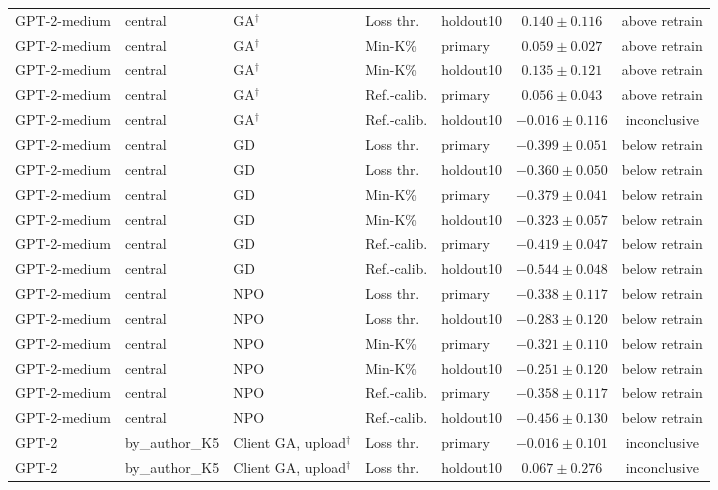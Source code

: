 \begin{table}[t]
\begin{tabular*}{\textwidth}{@{\extracolsep{\fill}}lllllcc@{}}
GPT-2-medium & central & GA$^{\dagger}$ & Loss thr. & holdout10 & $0.140 \pm 0.116$ & above retrain \\
GPT-2-medium & central & GA$^{\dagger}$ & Min-K\% & primary & $0.059 \pm 0.027$ & above retrain \\
GPT-2-medium & central & GA$^{\dagger}$ & Min-K\% & holdout10 & $0.135 \pm 0.121$ & above retrain \\
GPT-2-medium & central & GA$^{\dagger}$ & Ref.-calib. & primary & $0.056 \pm 0.043$ & above retrain \\
GPT-2-medium & central & GA$^{\dagger}$ & Ref.-calib. & holdout10 & $-0.016 \pm 0.116$ & inconclusive \\
GPT-2-medium & central & GD & Loss thr. & primary & $-0.399 \pm 0.051$ & below retrain \\
GPT-2-medium & central & GD & Loss thr. & holdout10 & $-0.360 \pm 0.050$ & below retrain \\
GPT-2-medium & central & GD & Min-K\% & primary & $-0.379 \pm 0.041$ & below retrain \\
GPT-2-medium & central & GD & Min-K\% & holdout10 & $-0.323 \pm 0.057$ & below retrain \\
GPT-2-medium & central & GD & Ref.-calib. & primary & $-0.419 \pm 0.047$ & below retrain \\
GPT-2-medium & central & GD & Ref.-calib. & holdout10 & $-0.544 \pm 0.048$ & below retrain \\
GPT-2-medium & central & NPO & Loss thr. & primary & $-0.338 \pm 0.117$ & below retrain \\
GPT-2-medium & central & NPO & Loss thr. & holdout10 & $-0.283 \pm 0.120$ & below retrain \\
GPT-2-medium & central & NPO & Min-K\% & primary & $-0.321 \pm 0.110$ & below retrain \\
GPT-2-medium & central & NPO & Min-K\% & holdout10 & $-0.251 \pm 0.120$ & below retrain \\
GPT-2-medium & central & NPO & Ref.-calib. & primary & $-0.358 \pm 0.117$ & below retrain \\
GPT-2-medium & central & NPO & Ref.-calib. & holdout10 & $-0.456 \pm 0.130$ & below retrain \\
GPT-2 & by\_author\_K5 & Client GA, upload$^{\dagger}$ & Loss thr. & primary & $-0.016 \pm 0.101$ & inconclusive \\
GPT-2 & by\_author\_K5 & Client GA, upload$^{\dagger}$ & Loss thr. & holdout10 & $0.067 \pm 0.276$ & inconclusive \\

\end{tabular*}
\end{table}
